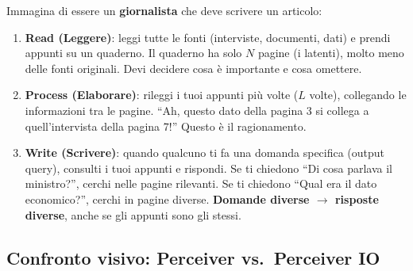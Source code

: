 \documentclass[12pt,a4paper]{article}
\begin{document}
\begin{notabox}
Immagina di essere un \textbf{giornalista} che deve scrivere un articolo:
\begin{enumerate}
    \item \textbf{Read (Leggere)}: leggi tutte le fonti (interviste, documenti, dati) e prendi appunti su un quaderno. Il quaderno ha solo $N$ pagine (i latenti), molto meno delle fonti originali. Devi decidere cosa \`e importante e cosa omettere.
    \item \textbf{Process (Elaborare)}: rileggi i tuoi appunti pi\`u volte ($L$ volte), collegando le informazioni tra le pagine. ``Ah, questo dato della pagina 3 si collega a quell'intervista della pagina 7!'' Questo \`e il ragionamento.
    \item \textbf{Write (Scrivere)}: quando qualcuno ti fa una domanda specifica (output query), consulti i tuoi appunti e rispondi. Se ti chiedono ``Di cosa parlava il ministro?'', cerchi nelle pagine rilevanti. Se ti chiedono ``Qual era il dato economico?'', cerchi in pagine diverse. \textbf{Domande diverse $\to$ risposte diverse}, anche se gli appunti sono gli stessi.
\end{enumerate}
\end{notabox}

\subsection{Confronto visivo: Perceiver vs.\ Perceiver IO}
\end{document}
